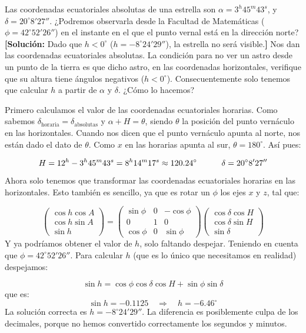 \begin{texercise}
	Las coordenadas ecuatoriales absolutas de una estrella son 	$\alpha = 3^{h}45^{m}43^{s}$, y $\delta = 20^\circ8'27''$. ¿Podremos observarla desde la Facultad de Matemáticas ($\phi = 42^\circ52'26''$) en el instante en el que el punto 
	vernal está en la dirección norte? \textbf{[Solución:} Dado que $h < 0^\circ$ 
	($h = -8^\circ24'29''$), la estrella no será visible.\textbf{]}
	\tcblower
	Nos dan las coordenadas ecuatoriales absolutas. La condición para no ver un astro desde un punto de la tierra es que dicho astro, en las coordenadas horizontales, verifique que su altura tiene ángulos negativos ($h<0^\circ$). Consecuentemente solo tenemos que calcular $h$ a partir de $\alpha$ y $\delta$. ¿Cómo lo hacemos? 
	
	Primero calculamos el valor de las coordenadas ecuatoriales horarias. Como sabemos $\delta_{\mathrm{horaria}} = \delta_{\mathrm{absolutas}}$ y $\alpha+H=\theta$, siendo $\theta$ la posición del punto vernáculo en las horizontales. Cuando nos dicen que el punto vernáculo apunta al norte, nos están dado el dato de $\theta$. Como $x$ en las horarias apunta al sur, $\theta=180^\circ$. Así pues:

	\begin{equation}
		H = 12^h - 3^h 45^m 43^s = 8^h 14^m 17^s \approx 120.24^\circ  \quad \quad \quad \delta=20^\circ 8'27''
	\end{equation}
	Ahora solo tenemos que transformar las coordenadas ecuatoriales horarias en las horizontales. Esto también es sencillo, ya que es rotar un $\phi$ los ejes $x$ y $z$, tal que: 
	
	\begin{equation}
		\begin{pmatrix}
			\cos h \cos A \\
			\cos h \sin A \\
			\sin h 
		\end{pmatrix} =\begin{pmatrix}
			\sin \phi & 0 &- \cos \phi \\
			0 & 1 & 0 \\
			 \cos \phi & 0 & \sin \phi
		\end{pmatrix}
		\begin{pmatrix}
			\cos \delta \cos H \\
			\cos \delta \sin H \\
			\sin \delta
		\end{pmatrix}
	\end{equation}
	Y ya podríamos obtener el valor de $h$, solo faltando despejar. Teniendo en cuenta que $\phi=42^\circ52'26''$. Para calcular $h$ (que es lo único que necesitamos en realidad) despejamos:

	\begin{equation}
		\sin h = \cos \phi \cos \delta \cos H + \sin \phi \sin \delta
	\end{equation}
	que es: 
	\begin{equation}
		\sin h = -0.1125 \quad \Longrightarrow \quad h = -6.46^\circ
	\end{equation}
	La solución correcta es $h = -8^\circ24'29''$. La diferencia es posiblemente culpa de los decimales, porque no hemos convertido correctamente los segundos y minutos. 
\end{texercise}
